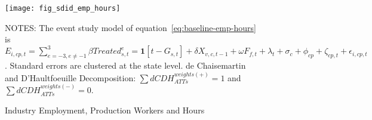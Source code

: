 \begin{figure}[H]
    \centering
    \texttt{[image: fig\_sdid\_emp\_hours]}
    \caption{Industry Employment, Production Workers and Hours}
    \label{fig:baseline-employment-hours}
    \begin{minipage}{\columnwidth}
        \vspace{0.05in}
        \tiny NOTES: The event study model of equation~\ref{eq:baseline-emp-hours} is $E_{i,cp,t} = \sum_{{e = -3},{e \neq -1}}^{3} \beta Treated_{s,t}^e = \textbf{1}[t - G_{s,t}] + \delta X_{v,c,t-1} + \omega F_{f,t} + \lambda_{t} + \sigma_{c} + \phi_{cp} + \zeta_{cp,t} + \epsilon_{i,cp,t}$. Standard errors are clustered at the state level. de Chaisemartin and D'Haultfoeuille Decomposition: $\sum dCDH_{ATTs}^{weights(+)} = 1$ and $\sum dCDH_{ATTs}^{weights(-)} = 0$.
    \end{minipage}
\end{figure}